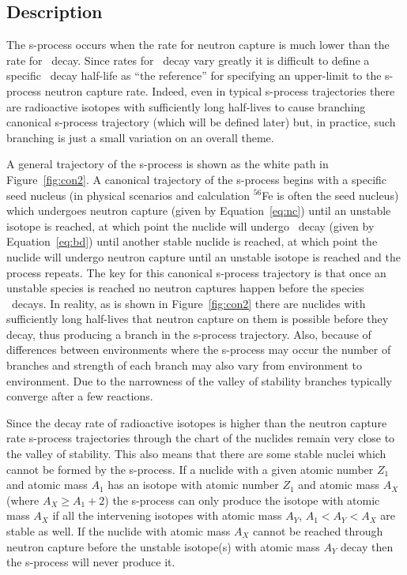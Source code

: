 \label{sec:s}
\subsection{Description}
The s-process occurs when
the rate for neutron capture is much lower than the rate
for \bminus\ decay.  Since rates for \bminus\ decay vary greatly
it is difficult to define a specific \bminus\ decay half-life as ``the
reference'' for specifying an upper-limit to the s-process neutron
capture rate.  Indeed, even in typical
s-process trajectories there are radioactive isotopes with
sufficiently long half-lives to cause branching canonical s-process
trajectory (which will be defined later) but, in practice, such
branching is just a small variation on an overall theme.  

A general trajectory of the s-process is shown as the white path in Figure~\ref{fig:con2}.  A
canonical trajectory of the s-process begins with a specific seed
nucleus (in physical scenarios and calculation $^{56}$Fe is often the
seed nucleus) which undergoes neutron capture (given by
Equation~\ref{eq:nc}) until an unstable isotope is reached, at which
point the nuclide will undergo \bminus\ decay (given by
Equation~\ref{eq:bd}) until another stable nuclide is reached, at
which point the nuclide will undergo neutron capture until an unstable
isotope is reached and the process repeats.  The key for this
canonical s-process trajectory is that once an unstable species is
reached no neutron captures happen before the species \bminus\
decays.  In reality, as is shown in Figure~\ref{fig:con2} there
are nuclides with sufficiently long half-lives that neutron capture on
them is possible before they decay, thus producing a branch in the
s-process trajectory.  Also, because of differences between
environments where the s-process may occur the number of branches and
strength of each branch may also vary from environment to
environment.  Due to the narrowness of the valley of stability
branches typically converge after a few reactions.

Since the decay rate of radioactive isotopes is higher than the
neutron capture rate s-process trajectories through the chart of the
nuclides remain very close to the valley of stability.  This also
means that there are some stable nuclei which cannot be formed by the
s-process.  If a nuclide with a given atomic number $Z_1$ and atomic
mass $A_1$ has an isotope with atomic number $Z_1$ and atomic mass
$A_X$ (where $A_X \geq A_1 +2$) the s-process can only produce the
isotope with atomic mass $A_X$ if all the intervening isotopes with
atomic mass $A_Y$, $A_1 < A_Y < A_X$ are stable as well.  If the
nuclide with atomic mass $A_X$ cannot be reached through neutron
capture before the unstable isotope(s) with atomic mass $A_Y$ decay
then the s-process will never produce it.

